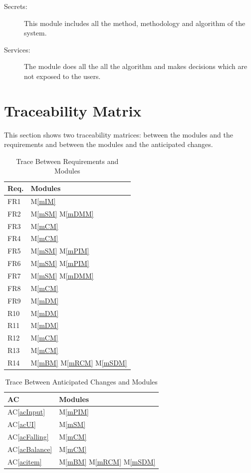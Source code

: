 \documentclass[12pt, titlepage]{article}
\newcommand{\acref}[1]{AC\ref{#1}}
\newcommand{\mref}[1]{M\ref{#1}}
\begin{document}
\begin{description}
\item[Secrets:]This module includes all the method, methodology and algorithm of the system.

\item[Services:]The module does all the all the algorithm and makes decisions which are not exposed to the users.
\end{description}

\section{Traceability Matrix} \label{SecTM}

This section shows two traceability matrices: between the modules and the
requirements and between the modules and the anticipated changes.

\begin{table}[H]
\centering
\begin{tabular}{p{} p{}}
\toprule
\textbf{Req.} & \textbf{Modules}\\
\midrule
FR1 & \mref{mIM} 		\\
FR2 & \mref{mSM}	\mref{mDMM}		\\
FR3 & \mref{mCM}		\\
FR4 & \mref{mCM}		\\
FR5 & \mref{mSM} \mref{mPIM}			\\
FR6 & \mref{mSM}	\mref{mPIM}	\\
FR7 & \mref{mSM} \mref{mDMM}			\\
FR8 & \mref{mCM}		\\
FR9 & \mref{mDM}		\\
R10 & \mref{mDM}		\\
R11 & \mref{mDM}		\\
R12 & \mref{mCM}		\\
R13 & \mref{mCM}		\\
R14 & \mref{mBM} \mref{mRCM} \mref{mSDM}		\\
\bottomrule
\end{tabular}
\caption{Trace Between Requirements and Modules}
\label{TblRT}
\end{table}

\begin{table}[H]
\centering
\begin{tabular}{p{} p{}}
\toprule
\textbf{AC} & \textbf{Modules}\\
\midrule
\acref{acInput} & \mref{mPIM}\\
\acref{acUI} &\mref{mSM}\\
\acref{acFalling} & \mref{mCM}	\\
\acref{acBalance} & \mref{mCM}	\\
\acref{acitem} &\mref{mBM} \mref{mRCM} \mref{mSDM}	\\
\bottomrule
\end{tabular}
\caption{Trace Between Anticipated Changes and Modules}
\label{TblACT}
\end{table}
\end{document}
